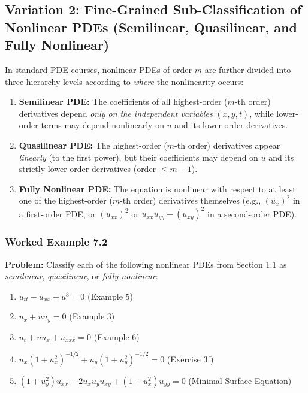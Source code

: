 \documentclass[11pt,a4paper]{article}
\begin{document}
\subsection{Variation 2: Fine-Grained Sub-Classification of Nonlinear PDEs (Semilinear, Quasilinear, and Fully Nonlinear)}
In standard PDE courses, nonlinear PDEs of order $m$ are further divided into three hierarchy levels according to \emph{where} the nonlinearity occurs:
\begin{enumerate}
    \item \textbf{Semilinear PDE:} The coefficients of all highest-order ($m$-th order) derivatives depend \emph{only on the independent variables} $(x, y, t)$, while lower-order terms may depend nonlinearly on $u$ and its lower-order derivatives.
    \item \textbf{Quasilinear PDE:} The highest-order ($m$-th order) derivatives appear \emph{linearly} (to the first power), but their coefficients may depend on $u$ and its strictly lower-order derivatives (order $\le m - 1$).
    \item \textbf{Fully Nonlinear PDE:} The equation is nonlinear with respect to at least one of the highest-order ($m$-th order) derivatives themselves (e.g., $(u_x)^2$ in a first-order PDE, or $(u_{xx})^2$ or $u_{xx}u_{yy} - (u_{xy})^2$ in a second-order PDE).
\end{enumerate}

\subsubsection*{Worked Example 7.2}
\textbf{Problem:} Classify each of the following nonlinear PDEs from Section 1.1 as \emph{semilinear}, \emph{quasilinear}, or \emph{fully nonlinear}:
\begin{enumerate}[label=(\alph*)]
    \item $u_{tt} - u_{xx} + u^3 = 0$ (Example 5)
    \item $u_x + u u_y = 0$ (Example 3)
    \item $u_t + u u_x + u_{xxx} = 0$ (Example 6)
    \item $u_x(1 + u_x^2)^{-1/2} + u_y(1 + u_y^2)^{-1/2} = 0$ (Exercise 3f)
    \item $(1 + u_y^2)u_{xx} - 2u_x u_y u_{xy} + (1 + u_x^2)u_{yy} = 0$ (Minimal Surface Equation)
\end{enumerate}
\end{document}
